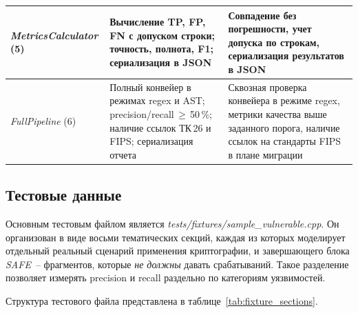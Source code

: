 \documentclass{itmo-vkr}
\newcommand{\code}[1]{\textit{#1}}
\begin{document}
\begin{longtable}{|p{4cm}|p{5cm}|p{6cm}|}
  \code{MetricsCalculator} (5)
    & Вычисление TP, FP, FN с допуском строки;
      точность, полнота, F1; сериализация в JSON
    & Совпадение без погрешности, учет допуска по строкам,
      сериализация результатов в JSON \\ \hline

  \code{FullPipeline} (6)
    & Полный конвейер в режимах regex и AST;
      \textenglish{precision}/\textenglish{recall}\,$\geq$\,50\,\%;
      наличие ссылок ТК\,26 и FIPS; сериализация отчета
    & Сквозная проверка конвейера в режиме regex, метрики
      качества выше заданного порога, наличие ссылок на
      стандарты FIPS в плане миграции \\

\end{longtable}


\subsection{Тестовые данные}

Основным тестовым файлом является
\code{tests/\allowbreak fixtures/\allowbreak sample\_vulnerable.cpp}.
Он организован в виде восьми тематических секций, каждая из
которых моделирует отдельный реальный сценарий применения
криптографии, и завершающего блока \code{SAFE}~-- фрагментов,
которые \emph{не должны} давать срабатываний.
Такое разделение позволяет измерять \textenglish{precision} и \textenglish{recall} раздельно
по категориям уязвимостей.

Структура тестового файла представлена в
таблице~\ref{tab:fixture_sections}.
\end{document}
